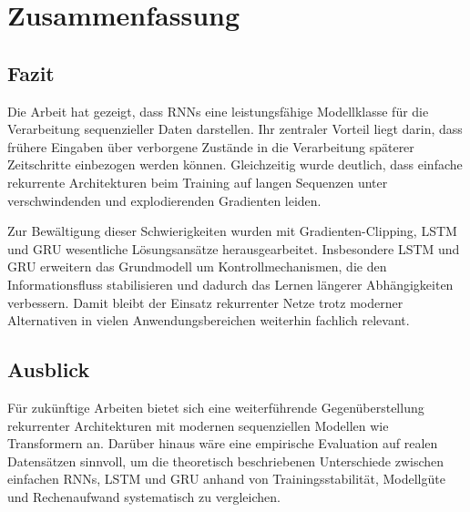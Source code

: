 \chapter{Zusammenfassung}

\section{Fazit}

Die Arbeit hat gezeigt, dass \acp{RNN} eine leistungsfähige Modellklasse für die Verarbeitung sequenzieller Daten darstellen. Ihr zentraler Vorteil liegt darin, dass frühere Eingaben über verborgene Zustände in die Verarbeitung späterer Zeitschritte einbezogen werden können. Gleichzeitig wurde deutlich, dass einfache rekurrente Architekturen beim Training auf langen Sequenzen unter verschwindenden und explodierenden Gradienten leiden.

Zur Bewältigung dieser Schwierigkeiten wurden mit Gradienten-Clipping, \ac{LSTM} und \ac{GRU} wesentliche Lösungsansätze herausgearbeitet. Insbesondere \ac{LSTM} und \ac{GRU} erweitern das Grundmodell um Kontrollmechanismen, die den Informationsfluss stabilisieren und dadurch das Lernen längerer Abhängigkeiten verbessern. Damit bleibt der Einsatz rekurrenter Netze trotz moderner Alternativen in vielen Anwendungsbereichen weiterhin fachlich relevant.

\section{Ausblick}

Für zukünftige Arbeiten bietet sich eine weiterführende Gegenüberstellung rekurrenter Architekturen mit modernen sequenziellen Modellen wie Transformern an. Darüber hinaus wäre eine empirische Evaluation auf realen Datensätzen sinnvoll, um die theoretisch beschriebenen Unterschiede zwischen einfachen \acp{RNN}, \ac{LSTM} und \ac{GRU} anhand von Trainingsstabilität, Modellgüte und Rechenaufwand systematisch zu vergleichen.
